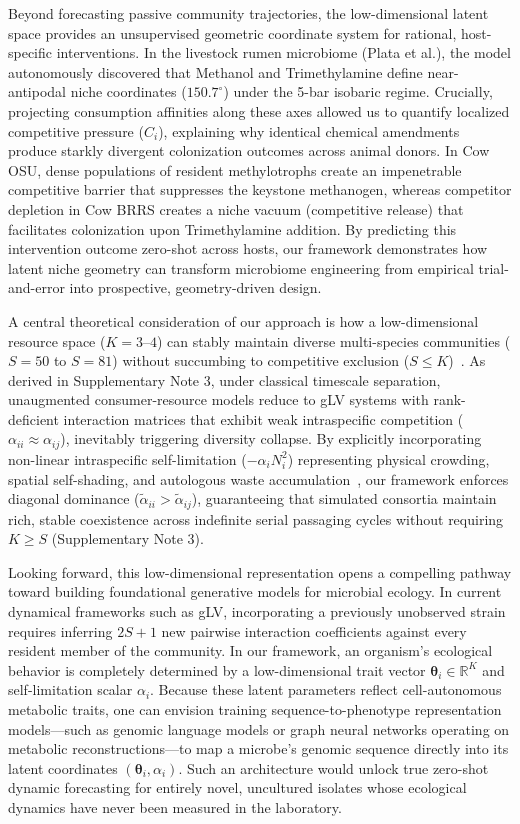 Beyond forecasting passive community trajectories, the low-dimensional latent space provides an unsupervised geometric coordinate system for rational, host-specific interventions. In the livestock rumen microbiome (Plata et al.), the model autonomously discovered that Methanol and Trimethylamine define near-antipodal niche coordinates ($150.7^\circ$) under the 5-bar isobaric regime. Crucially, projecting consumption affinities along these axes allowed us to quantify localized competitive pressure ($C_i$), explaining why identical chemical amendments produce starkly divergent colonization outcomes across animal donors. In Cow OSU, dense populations of resident methylotrophs create an impenetrable competitive barrier that suppresses the keystone methanogen, whereas competitor depletion in Cow BRRS creates a niche vacuum (competitive release) that facilitates colonization upon Trimethylamine addition. By predicting this intervention outcome zero-shot across hosts, our framework demonstrates how latent niche geometry can transform microbiome engineering from empirical trial-and-error into prospective, geometry-driven design.

A central theoretical consideration of our approach is how a low-dimensional resource space ($K=3\text{--}4$) can stably maintain diverse multi-species communities ($S=50$ to $S=81$) without succumbing to competitive exclusion ($S \le K$)~\cite{macarthur1970species,tilman1982resource}. As derived in Supplementary Note 3, under classical timescale separation, unaugmented consumer-resource models reduce to gLV systems with rank-deficient interaction matrices that exhibit weak intraspecific competition ($\alpha_{ii} \approx \alpha_{ij}$), inevitably triggering diversity collapse. By explicitly incorporating non-linear intraspecific self-limitation ($-\alpha_i N_i^2$) representing physical crowding, spatial self-shading, and autologous waste accumulation~\cite{barbier2020generic}, our framework enforces diagonal dominance ($\tilde{\alpha}_{ii} > \tilde{\alpha}_{ij}$), guaranteeing that simulated consortia maintain rich, stable coexistence across indefinite serial passaging cycles without requiring $K \ge S$ (Supplementary Note 3).

Looking forward, this low-dimensional representation opens a compelling pathway toward building foundational generative models for microbial ecology. In current dynamical frameworks such as gLV, incorporating a previously unobserved strain requires inferring $2S + 1$ new pairwise interaction coefficients against every resident member of the community. In our framework, an organism's ecological behavior is completely determined by a low-dimensional trait vector $\mathbf{\theta}_i \in \mathbb{R}^K$ and self-limitation scalar $\alpha_i$. Because these latent parameters reflect cell-autonomous metabolic traits, one can envision training sequence-to-phenotype representation models---such as genomic language models or graph neural networks operating on metabolic reconstructions---to map a microbe's genomic sequence directly into its latent coordinates $(\mathbf{\theta}_i, \alpha_i)$. Such an architecture would unlock true zero-shot dynamic forecasting for entirely novel, uncultured isolates whose ecological dynamics have never been measured in the laboratory.

